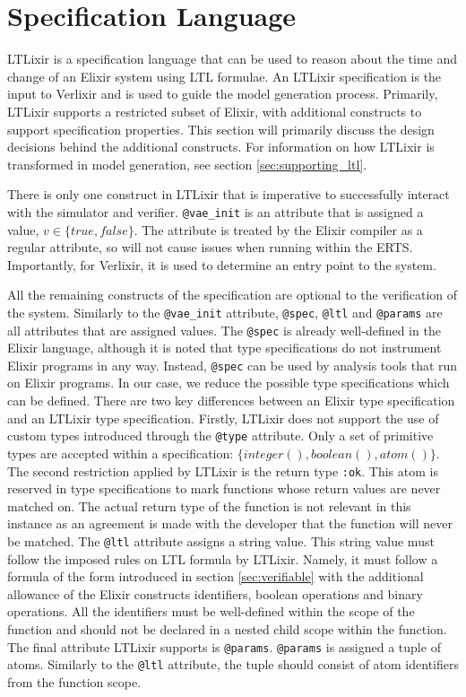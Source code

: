 \section{Specification Language} \label{sec:specification_language}
LTLixir is a specification language that can be used to reason about the time and change of an Elixir system using LTL formulae. An LTLixir specification is the input to Verlixir and is used to guide the model generation process. Primarily, LTLixir supports a restricted subset of Elixir, with additional constructs to support specification properties. This section will primarily discuss the design decisions behind the additional constructs. For information on how LTLixir is transformed in model generation, see section \ref{sec:supporting_ltl}.
\par
There is only one construct in LTLixir that is imperative to successfully interact with the simulator and verifier. \texttt{@vae\_init} is an attribute that is assigned a value, $v \in \{true, false\}$. The attribute is treated by the Elixir compiler as a regular attribute, so will not cause issues when running within the ERTS. Importantly, for Verlixir, it is used to determine an entry point to the system.
\par
All the remaining constructs of the specification are optional to the verification of the system. Similarly to the \texttt{@vae\_init} attribute, \texttt{@spec}, \texttt{@ltl} and \texttt{@params} are all attributes that are assigned values. The \texttt{@spec} is already well-defined in the Elixir language, although it is noted that type specifications do not instrument Elixir programs in any way. Instead, \texttt{@spec} can be used by analysis tools that run on Elixir programs. In our case, we reduce the possible type specifications which can be defined. There are two key differences between an Elixir type specification and an LTLixir type specification. Firstly, LTLixir does not support the use of custom types introduced through the \texttt{@type} attribute. Only a set of primitive types are accepted within a specification: $\{integer(), boolean(), atom()\}$. The second restriction applied by LTLixir is the return type \texttt{:ok}. This atom is reserved in type specifications to mark functions whose return values are never matched on. The actual return type of the function is not relevant in this instance as an agreement is made with the developer that the function will never be matched. The \texttt{@ltl} attribute assigns a string value. This string value must follow the imposed rules on LTL formula by LTLixir. Namely, it must follow a formula of the form introduced in section \ref{sec:verifiable} with the additional allowance of the Elixir constructs identifiers, boolean operations and binary operations. All the identifiers must be well-defined within the scope of the function and should not be declared in a nested child scope within the function. The final attribute LTLixir supports is \texttt{@params}. \texttt{@params} is assigned a tuple of atoms. Similarly to the \texttt{@ltl} attribute, the tuple should consist of atom identifiers from the function scope.
